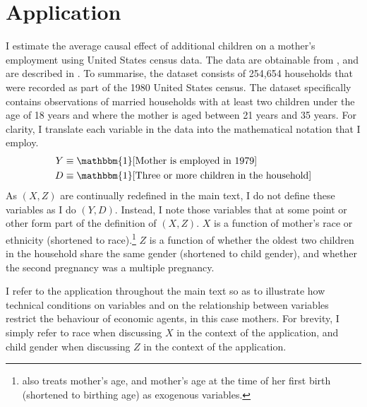 \documentclass[10pt,a4paper,twoside]{article}
\newcommand{\US}{United States}
\numberwithin{equation}{section}
\begin{document}
\section*{Application}
I estimate the average causal effect of additional children on a mother's employment using {\US} census data. The data are obtainable from \cite{Angristdatabank}, and are described in \cite{ae98}. To summarise, the dataset consists of 254,654 households that were recorded as part of the 1980 {\US} census. The dataset specifically contains observations of married households with at least two children under the age of 18 years and where the mother is aged between 21 years and 35 years. For clarity, I translate each variable in the data into the mathematical notation that I employ.
\begin{align*}
Y&\equiv\mathbbm{1}[\text{Mother is employed in 1979}]\\
D&\equiv\mathbbm{1}[\text{Three or more children in the household}]
\end{align*}
As $(X,Z)$ are continually redefined in the main text, I do not define these variables as I do $(Y,D)$. Instead, I note those variables that at some point or other form part of the definition of $(X,Z)$. $X$ is a function of mother's race or ethnicity (shortened to race).\footnote{\cite{ae98} also treats mother's age, and mother's age at the time of her first birth (shortened to birthing age) as exogenous variables.} $Z$ is a function of whether the oldest two children in the household share the same gender (shortened to child gender), and whether the second pregnancy was a multiple pregnancy.

I refer to the application throughout the main text so as to illustrate how technical conditions on variables and on the relationship between variables restrict the behaviour of economic agents, in this case mothers. For brevity, I simply refer to race when discussing $X$ in the context of the application, and child gender when discussing $Z$ in the context of the application.
\end{document}
